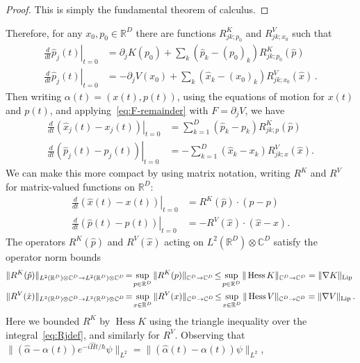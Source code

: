 \documentclass[11pt]{amsart}
\def\bbC{{\mathbb{C}}}
\def\Real{{\mathbb R}}
\numberwithin{equation}{section}
\begin{document}
\begin{proof}
This is simply the fundamental theorem of calculus.
\end{proof}
Therefore, for any $x_0,p_0\in\Real^D$ there are functions $R_{jk;p_0}^K$ and $R_{jk;x_0}^V$ such that
\begin{align*}
\left. \frac{d}{dt}\hat{p}_j(t)\right|_{t=0} &= \partial_j K(p_0) + \sum_k (\hat{p}_k-(p_0)_k) R_{jk;p_0}^K(\hat{p}) \\
\left. \frac{d}{dt}\hat{p}_j(t)\right|_{t=0} &= -\partial_j V(x_0) + \sum_k (\hat{x}_k-(x_0)_k) R_{jk;x_0}^V(\hat{x})\,.
\end{align*}
Then writing $\alpha(t)= (x(t),p(t))$, using the equations of motion for $x(t)$ and $p(t)$, and
applying~\eqref{eq:F-remainder} with $F=\partial_j V$, we have
\begin{align*}
\left.\frac{d}{dt} (\hat{x}_j(t)-x_j(t))\right|_{t=0} &= \sum_{k=1}^D (\hat{p}_k - p_k) R^K_{jk;p}(\hat{p}) \\
\left.\frac{d}{dt} (\hat{p}_j(t)-p_j(t))\right|_{t=0} &= -\sum_{k=1}^D (\hat{x}_k - x_k) R^V_{jk;x}(\hat{x}).
\end{align*}
We can make this more compact by using matrix notation, writing $R^K$ and $R^V$ for matrix-valued functions on $\Real^D$:
\begin{align*}
\left.\frac{d}{dt} (\hat{x}(t)-x(t))\right|_{t=0} &= R^K(\hat{p}) \cdot (\hat{p} - p)  \\
\left.\frac{d}{dt} (\hat{p}(t)-p(t))\right|_{t=0} &= - R^V(\hat{x}) \cdot (\hat{x} - x).
\end{align*}
The operators $R^K(\hat{p})$ and $R^V(\hat{x})$ acting on $L^2(\Real^D)\otimes \bbC^D$ satisfy the operator norm bounds
\begin{align*}
\|R^K(\hat{p})\|_{L^2(\Real^D) \otimes \bbC^D \to L^2(\Real^D)\otimes \bbC^D}
&\!=\! \sup_{p\in\Real^D} \|R^K(p)\|_{\bbC^D\to\bbC^D} \!\leq\! \sup_{p\in\Real^D} \|\operatorname*{Hess} K\|_{\bbC^D\to\bbC^D}
= \|\nabla K \|_{\rm Lip}\\
\|R^V(\hat{x})\|_{L^2(\Real^D) \otimes \bbC^D \to L^2(\Real^D)\otimes \bbC^D}
&\!=\! \sup_{x\in\Real^D} \|R^V(x)\|_{\bbC^D\to\bbC^D} \!\leq\! \sup_{x\in\Real^D} \|\operatorname*{Hess} V\|_{\bbC^D\to\bbC^D}
= \|\nabla V \|_{\rm Lip} \,.
\end{align*}
Here we bounded $R^K$ by $\operatorname*{Hess} K$ using the triangle inequality over the integral~\eqref{eq:Rjdef}, and similarly for $R^V$. Observing that $\|(\hat{\alpha}-\alpha(t))e^{-i\hat{H}t/\hbar}\psi\|_{L^2} = \|(\hat{\alpha}(t)-\alpha(t))\psi\|_{L^2}$,
\end{document}
